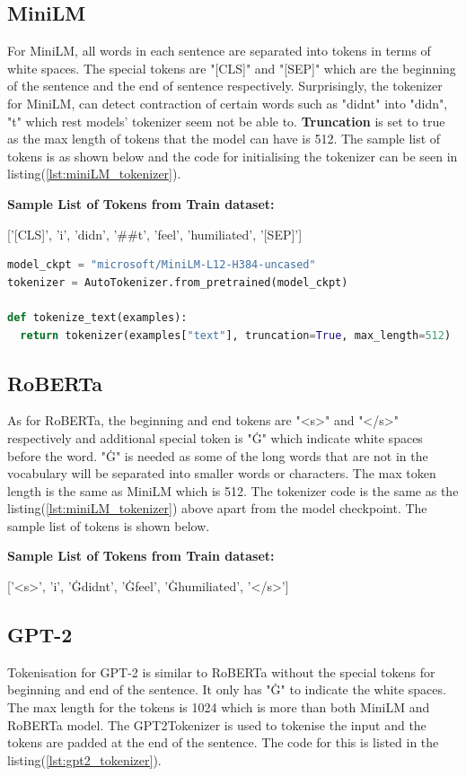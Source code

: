 \subsection{MiniLM}
For MiniLM, all words in each sentence are separated into tokens in terms of white spaces. The special tokens are "[CLS]" and "[SEP]" which are the beginning of the sentence and the end of sentence respectively. Surprisingly, the tokenizer for MiniLM, can detect contraction of certain words such as "didnt" into "didn", "t" which rest models' tokenizer seem not be able to. \textbf{Truncation} is set to true as the max length of tokens that the model can have is 512. The sample list of tokens is as shown below and the code for initialising the tokenizer can be seen in listing(\ref{lst:miniLM_tokenizer}).

\textbf{Sample List of Tokens from Train dataset:}

['[CLS]', 'i', 'didn', '\#\#t', 'feel', 'humiliated', '[SEP]']\\

\begin{lstlisting}[language=Python, caption=The code for initialising tokenizer for MiniLM, label=lst:miniLM_tokenizer]
model_ckpt = "microsoft/MiniLM-L12-H384-uncased"
tokenizer = AutoTokenizer.from_pretrained(model_ckpt)

def tokenize_text(examples):
  return tokenizer(examples["text"], truncation=True, max_length=512)
\end{lstlisting}

\subsection{RoBERTa}
As for RoBERTa, the beginning and end tokens are "<s>" and "</s>" respectively and additional special token is "Ġ" which indicate white spaces before the word. "Ġ" is needed as some of the long words that are not in the vocabulary will be separated into smaller words or characters. The max token length is the same as MiniLM which is 512. The tokenizer code is the same as the listing(\ref{lst:miniLM_tokenizer}) above apart from the model checkpoint. The sample list of tokens is shown below.

\textbf{Sample List of Tokens from Train dataset:}

['<s>', 'i', 'Ġdidnt', 'Ġfeel', 'Ġhumiliated', '</s>']

\subsection{GPT-2}
Tokenisation for GPT-2 is similar to RoBERTa without the special tokens for beginning and end of the sentence. It only has "Ġ" to indicate the white spaces. The max length for the tokens is 1024 which is more than both MiniLM and RoBERTa model. The GPT2Tokenizer is used to tokenise the input and the tokens are padded at the end of the sentence. The code for this is listed in the listing(\ref{lst:gpt2_tokenizer}).

